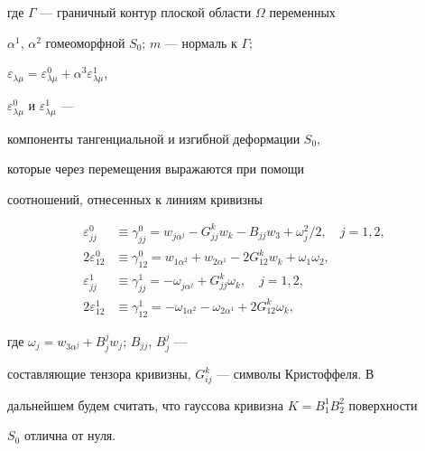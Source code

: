 где $\Gamma$ --- граничный контур плоской области $\Omega$ переменных 


$\alpha^1$, $\alpha^2$ гомеоморфной $S_0$; $m$ --- нормаль к $\Gamma$; 


$\varepsilon_{\lambda\mu}=\varepsilon^0_{\lambda\mu}+ 


\alpha^3\varepsilon^1_{\lambda\mu}$, 


$\varepsilon^0_{\lambda\mu}$ и $\varepsilon^1_{\lambda\mu}$ --- 


компоненты тангенциальной и изгибной деформации $S_0$, 


которые через перемещения выражаются при помощи 


соотношений, отнесенных к линиям кривизны 


\begin{equation} 


\begin{split} 


\varepsilon^0_{jj}&\equiv \gamma^0_{jj}=w_{j\alpha^j}- 


G^k_{jj}w_k-B_{jj}w_3+\omega^2_j/2,\quad j=1,2,\\ 


% 


2\varepsilon^0_{12}&\equiv \gamma^0_{12}=w_{1\alpha^2}+ 


w_{2\alpha^1}-2G^k_{12}w_k+\omega_1\omega_2,\\ 


% 


\varepsilon^1_{jj}&\equiv \gamma^1_{jj}=-\omega_{j\alpha^j}+ 


G^k_{jj}\omega_k,\quad j=1,2,\\ 


% 


2\varepsilon^1_{12}&\equiv \gamma^1_{12}=-\omega_{1\alpha^2} 


-\omega_{2\alpha^1}+2G^k_{12}\omega_k, 


\end{split} 


\end{equation} 


где $\omega_j=w_{3\alpha^j}+B^j_j w_j$; $B_{jj}$, $B^j_j$ --- 


составляющие тензора кривизны, $G^k_{ij}$ --- символы Кристоффеля. В 


дальнейшем будем считать, что гауссова кривизна $K=B^1_1B^2_2$ поверхности 


$S_0$ отлична от нуля. 


